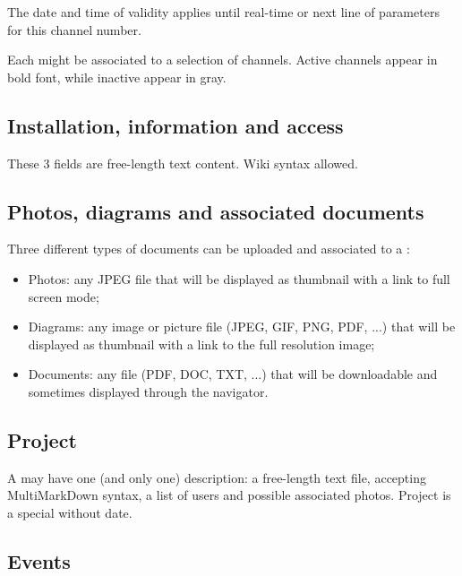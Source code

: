 The date and time of validity applies until real-time or next line of parameters for this channel number.

Each  might be associated to a selection of channels. Active channels appear in bold font, while inactive appear in gray.


\subsection{Installation, information and access}

These 3 fields are free-length text content. Wiki syntax allowed.

\subsection{Photos, diagrams and associated documents}

Three different types of documents can be uploaded and associated to a :
\begin{itemize}
	\item Photos: any JPEG file that will be displayed as thumbnail with a link to full screen mode;
	\item Diagrams: any image or picture file (JPEG, GIF, PNG, PDF, ...) that will be displayed as thumbnail with a link to the full resolution image;
	\item Documents: any file (PDF, DOC, TXT, ...) that will be downloadable and sometimes displayed through the navigator.
\end{itemize}


\subsection{Project}
\label{projectnode}

A  may have one (and only one)  description: a free-length text file, accepting MultiMarkDown syntax, a list of users and possible associated photos. Project is a special  without date.

\subsection{Events}
\label{eventnode}

